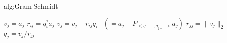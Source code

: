 \begin{alg}{alg:Gram-Schmidt}
    \vspace{-0.3cm}
    \begin{tcolorbox}[colback=white, colframe=gray, arc=0mm] 
        \begin{algorithmic}[1]
            \State $v_j = a_j$
                \State $r_{ij} = q_i^* a_j$
                \State $v_j = v_j - r_{ij} q_i$ \ $(= a_j - P_{<q_1,\ldots,q_{j-1}>} a_j)$
            \EndFor
            \State $r_{jj} = \|v_j\|_2$
            \State $q_j = v_j / r_{jj}$
        \EndFor
        \end{algorithmic}
    \end{tcolorbox}
    \vspace{-0.3cm}
\end{alg}


